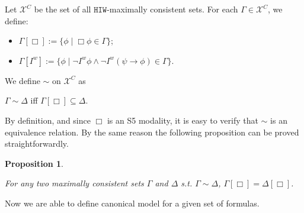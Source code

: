 \documentclass{article}
\newtheorem{prop}{Proposition}
\begin{document}
Let $\mathcal{X}^{C}$ be the set of all $\mathtt{HIW}$-maximally consistent sets. For each $\Gamma \in \mathcal{X}^{C}$, we define:

\begin{itemize}

\item $\Gamma[\Box] := \{ \phi \mid \Box \phi \in \Gamma\}$;

\item $\Gamma[I^{w}] := \{\phi \mid \neg I^{w} \phi \wedge \neg I^{w} (\psi \rightarrow \phi) \in \Gamma\}$.



\end{itemize}

We define $\sim$ on $\mathcal{X}^{C}$ as 

\begin{center}

$\Gamma \sim \Delta$ iff $\Gamma[\Box] \subseteq \Delta$.

\end{center}

By definition, and since $\Box$ is an S5 modality, it is easy to verify that $\sim$ is an equivalence relation. By the same reason the following proposition can be proved straightforwardly.

\begin{prop}
\label{equivIW}

For any two maximally consistent sets $\Gamma$ and $\Delta$ s.t. $\Gamma \sim \Delta$, $\Gamma[\Box] = \Delta[\Box]$.

\end{prop}


Now we are able to define canonical model for a given set of formulas.
\end{document}
